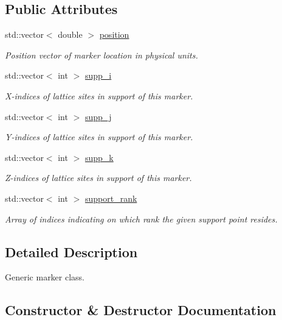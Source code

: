 \subsection*{Public Attributes}
\begin{DoxyCompactItemize}
\item 
std\+::vector$<$ double $>$ \hyperlink{class_marker_a988d209a817df43124a100fb54b00b70}{position}
\begin{DoxyCompactList}\small\item\em Position vector of marker location in physical units. \end{DoxyCompactList}\item 
std\+::vector$<$ int $>$ \hyperlink{class_marker_af2b0bab614609f2e9c5bebc1db3f8174}{supp\+\_\+i}
\begin{DoxyCompactList}\small\item\em X-\/indices of lattice sites in support of this marker. \end{DoxyCompactList}\item 
std\+::vector$<$ int $>$ \hyperlink{class_marker_a400ae7b896edf2abe0403dde435b0977}{supp\+\_\+j}
\begin{DoxyCompactList}\small\item\em Y-\/indices of lattice sites in support of this marker. \end{DoxyCompactList}\item 
std\+::vector$<$ int $>$ \hyperlink{class_marker_ab06b6d2cfb7221579cf32538f0c79b82}{supp\+\_\+k}
\begin{DoxyCompactList}\small\item\em Z-\/indices of lattice sites in support of this marker. \end{DoxyCompactList}\item 
std\+::vector$<$ int $>$ \hyperlink{class_marker_a183752ab41e56b159570a103c25f2aec}{support\+\_\+rank}
\begin{DoxyCompactList}\small\item\em Array of indices indicating on which rank the given support point resides. \end{DoxyCompactList}\end{DoxyCompactItemize}


\subsection{Detailed Description}
Generic marker class. 

\subsection{Constructor \& Destructor Documentation}

